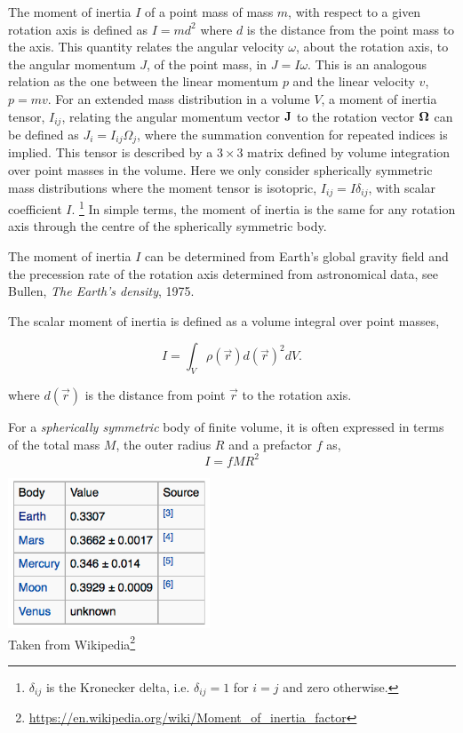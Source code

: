 
The moment of inertia $I$ of a point mass of mass $m$,
with respect to a given rotation axis is defined as $I = m d^2$
where $d$ is the distance from the point mass to the axis.
This quantity relates the angular velocity $\omega$, 
about the rotation axis,
to the angular momentum $J$, of the point mass, in $J = I \omega$.
This is an analogous relation as the one between the linear momentum $p$
and the linear velocity $v$, $p = m v$. 
For an extended mass distribution in a volume $V$,
a moment of inertia tensor, $I_{ij}$,
relating the angular momentum vector ${\bf J}$ to the rotation vector ${\bf \Omega}$
can be defined as $J_i = I_{ij} \Omega_j$, where the summation convention for repeated
indices is implied.
This tensor is described by a $3 \times 3$ matrix defined by volume integration
over point masses in the volume.
Here we only consider spherically symmetric mass distributions where
the moment tensor is isotopric, $I_{ij} = I \delta_{ij}$,
with scalar coefficient $I$.
\footnote{
$\delta_{ij}$ is the Kronecker delta, i.e. $\delta_{ij}=1$ for
$i=j$ and zero otherwise. }
In simple terms, the moment of inertia is the same for any rotation axis
through the centre of the spherically symmetric body.

The moment of inertia $I$ can be determined from Earth's global gravity
field and the precession rate of the rotation axis determined 
from astronomical data, see Bullen, {\it The Earth's density}, 1975.


The scalar moment of inertia is defined as
a volume integral over point masses,
\begin{mdframed}[backgroundcolor=blue!5]
\begin{equation}
I = \int_V \rho(\vec{r}) d(\vec r)^2 dV. \label{eq:momI}
\end{equation}
\end{mdframed}
where $d(\vec r)$ is the distance from point $\vec{r}$ to the rotation axis.

For a {\it spherically symmetric} body of finite volume, 
it is often expressed in terms of the total mass $M$, the outer radius $R$ 
and a prefactor $f$ as,
\begin{equation}
\boxed{    I = f M R^2}
\label{def_momint_prefact}
\end{equation}

\begin{center}
\includegraphics[width=6cm]{images/gravity/moments}\\
{\captionfont Taken from Wikipedia\footnote{\url{https://en.wikipedia.org/wiki/Moment_of_inertia_factor}}}
\end{center}

